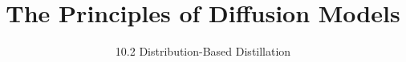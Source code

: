 ﻿%

\title{The Principles of Diffusion Models}
\subtitle{10.2 Distribution-Based Distillation}


\begin{frame}
    \titlepage
\end{frame}


